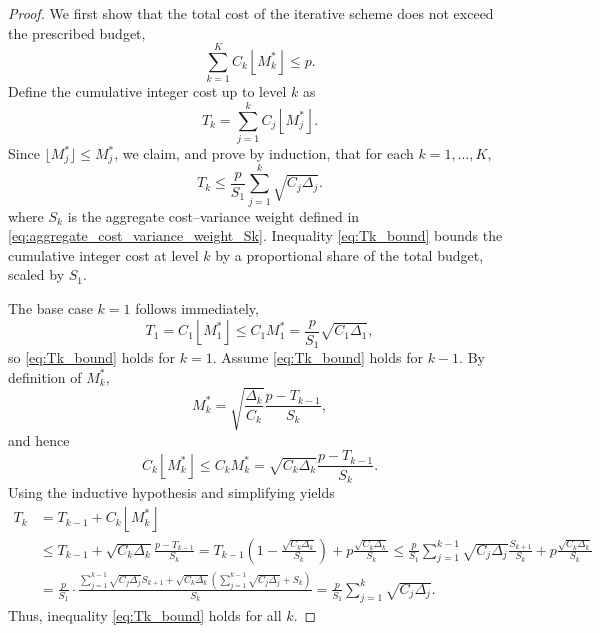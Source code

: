 \begin{proof}
We first show that the total cost of the iterative scheme does not exceed the prescribed budget,
\[
\sum_{k=1}^K C_k \left\lfloor M_k^* \right\rfloor \le p.
\]
Define the cumulative integer cost up to level $k$ as
\[
T_k = \sum_{j=1}^k C_j\left\lfloor M_j^* \right\rfloor.
\]
Since $\lfloor M_j^* \rfloor \le M_j^*$, we claim, and prove by induction, that for each $k = 1, \ldots, K$,
\begin{equation}\label{eq:Tk_bound}
T_k \le \frac{p}{S_1}\sum_{j=1}^k \sqrt{C_j \Delta_j}.
\end{equation}
where $S_k$ is the aggregate cost–variance weight defined in \eqref{eq:aggregate_cost_variance_weight_Sk}. 
Inequality \eqref{eq:Tk_bound} bounds the cumulative integer cost at level $k$ by a proportional share of the total budget, scaled by $S_1$.







The base case $k=1$ follows immediately,
\[
T_1=C_1 \left\lfloor M_1^* \right\rfloor \le C_1M_1^* = \frac{p}{S_1}\sqrt{C_1\Delta_1},
\]
so \eqref{eq:Tk_bound} holds for \(k=1\). Assume \eqref{eq:Tk_bound} holds for \(k-1\). By definition of \(M_k^*\),
%
\[
M_k^* = \sqrt{\frac{\Delta_k}{C_k}}\frac{p - T_{k-1}}{S_k},
\]
%
and hence
%
\[
C_k \left\lfloor M_k^* \right\rfloor \le C_k M_k^*  = \sqrt{C_k\Delta_k}\frac{p-T_{k-1}}{S_k}.
\]
%
Using the inductive hypothesis and simplifying yields
\begin{align*}
    T_k &= T_{k-1}+C_k\left\lfloor M_k^* \right\rfloor \\
    &\le T_{k-1} + \sqrt{C_k\Delta_k}\frac{p-T_{k-1}}{S_k}
    =T_{k-1}\left(1-\frac{\sqrt{C_k\Delta_k}}{S_k}\right) + p\frac{\sqrt{C_k\Delta_k}}{S_k}
    \le \frac{p}{S_1}\sum_{j=1}^{k-1} \sqrt{C_j\Delta_j}\frac{S_{k+1}}{S_k}+p\frac{\sqrt{C_k\Delta_k}}{S_k}\\
    &=\frac{p}{S_1}\cdot \frac{\sum_{j=1}^{k-1} \sqrt{C_j\Delta_j}S_{k+1}+\sqrt{C_k\Delta_k}\left(\sum_{j=1}^{k-1}\sqrt{C_j\Delta_j}+S_k\right)}{S_k}
    =\frac{p}{S_1}\sum_{j=1}^k\sqrt{C_j\Delta_j}.
\end{align*}
%
Thus, inequality \eqref{eq:Tk_bound} holds for all $k$. 


\end{proof}

